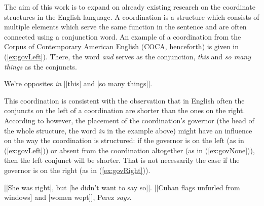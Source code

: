 The aim of this work is to expand on already existing research on the coordinate structures in the English language. A coordination is a structure which consists of multiple elements which serve the same function in the sentence and are often connected using a conjunction word. An example of a coordination from the Corpus of Contemporary American English \citep{coca} (COCA, henceforth) is given in (\ref{ex:govLeft}). There, the word \textsl{and} serves as the conjunction, \textsl{this} and \textsl{so many things} as the conjuncts.

\begin{exe}
    \ex
    \label{ex:govLeft} We're opposites \textsl{in} [[this] and [so many things]].
\end{exe}

This coordination is consistent with the observation that in English often the conjuncts on the left of a coordination are shorter than the ones on the right. According to \cite{prz:woz:23} however, the placement of the coordination's governor (the head of the whole structure, the word \textsl{in} in the example above) might have an influence on the way the coordination is structured: if the governor is on the left (as in (\ref{ex:govLeft})) or absent from the coordination altogether (as in (\ref{ex:govNone})), then the left conjunct will be shorter. That is not necessarily the case if the governor is on the right (as in (\ref{ex:govRight})).

\begin{exe}
    \ex\label{ex:govNone} [[She was right], but [he didn't want to say so]].
    \ex\label{ex:govRight} [[Cuban flags unfurled from windows] and [women wept]], Perez \textsl{says}.
\end{exe}


